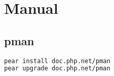 \part{Manual}




\chapter{pman}



\begin{lstlisting}[language=bash]
pear install doc.php.net/pman
pear upgrade doc.php.net/pman
\end{lstlisting}


